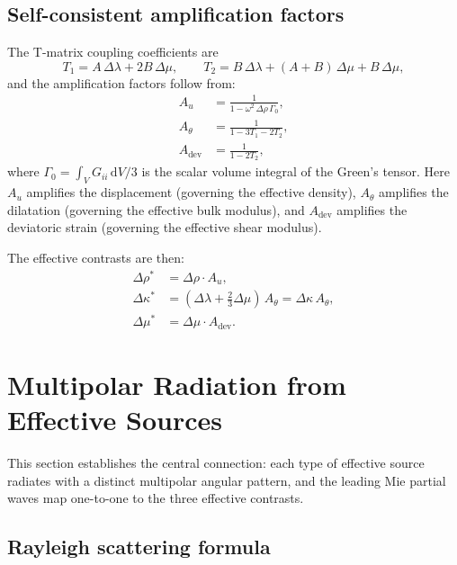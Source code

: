 \documentclass[11pt,a4paper]{article}
\newcommand{\dd}{\mathrm{d}}
\newcommand{\Dlam}{\Delta\lambda}
\newcommand{\Dmu}{\Delta\mu}
\newcommand{\Drho}{\Delta\rho}
\newcommand{\Dkappa}{\Delta\kappa}
\begin{document}
\subsection{Self-consistent amplification factors}

The T-matrix coupling coefficients are
\begin{equation}
  T_1 = A\,\Dlam + 2B\,\Dmu, \qquad
  T_2 = B\,\Dlam + (A + B)\,\Dmu + B\,\Dmu,
\end{equation}
and the amplification factors follow from:
\begin{align}
  A_u &= \frac{1}{1 - \omega^2\,\Drho\,\Gamma_0},
  \label{eq:amp_u} \\[4pt]
  A_\theta &= \frac{1}{1 - 3T_1 - 2T_2},
  \label{eq:amp_theta} \\[4pt]
  A_\text{dev} &= \frac{1}{1 - 2T_2},
  \label{eq:amp_dev}
\end{align}
where $\Gamma_0 = \int_V G_{ii}\,\dd V / 3$ is the scalar volume
integral of the Green's tensor.  Here $A_u$ amplifies the
displacement (governing the effective density), $A_\theta$ amplifies
the dilatation (governing the effective bulk modulus), and
$A_\text{dev}$ amplifies the deviatoric strain (governing the
effective shear modulus).

The effective contrasts are then:
\begin{align}
  \Drho^*   &= \Drho \cdot A_u,
  \label{eq:Drho_star} \\[4pt]
  \Dkappa^* &= (\Dlam + \tfrac{2}{3}\Dmu)\,A_\theta
             = \Dkappa\,A_\theta,
  \label{eq:Dkappa_star} \\[4pt]
  \Dmu^*    &= \Dmu \cdot A_\text{dev}.
  \label{eq:Dmu_star}
\end{align}

\section{Multipolar Radiation from Effective Sources}
\label{sec:multipolar}

This section establishes the central connection: each type of effective
source radiates with a distinct multipolar angular pattern, and the
leading Mie partial waves map one-to-one to the three effective
contrasts.

\subsection{Rayleigh scattering formula}
\end{document}
